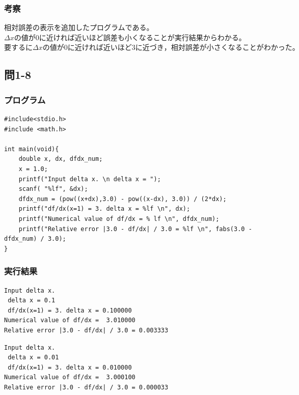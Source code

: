 \documentclass{jarticle}
\begin{document}
\subsubsection{考察\\}
相対誤差の表示を追加したプログラムである。\\
$\Delta {x}の値が0に近ければ近いほど誤差も小くなることが実行結果からわかる。$\\
$要するに\Delta {x}の値が0に近ければ近いほど3に近づき，相対誤差が小さくなることがわかった。$\\

\subsection{問1-8\\}
\subsubsection{プログラム\\}
\begin{breakbox}
\begin{verbatim}
#include<stdio.h>
#include <math.h>

int main(void){
	double x, dx, dfdx_num;
	x = 1.0;
	printf("Input delta x. \n delta x = ");
	scanf( "%lf", &dx);
  	dfdx_num = (pow((x+dx),3.0) - pow((x-dx), 3.0)) / (2*dx);	
	printf("df/dx(x=1) = 3. delta x = %lf \n", dx);
	printf("Numerical value of df/dx = % lf \n", dfdx_num);
  	printf("Relative error |3.0 - df/dx| / 3.0 = %lf \n", fabs(3.0 - dfdx_num) / 3.0);
}
\end{verbatim}
\end{breakbox}
\subsubsection{実行結果\\}
\begin{breakbox}
\begin{verbatim}
Input delta x. 
 delta x = 0.1
 df/dx(x=1) = 3. delta x = 0.100000 
Numerical value of df/dx =  3.010000 
Relative error |3.0 - df/dx| / 3.0 = 0.003333 
\end{verbatim}
\end{breakbox}

\begin{breakbox}
\begin{verbatim}
Input delta x. 
 delta x = 0.01
 df/dx(x=1) = 3. delta x = 0.010000 
Numerical value of df/dx =  3.000100 
Relative error |3.0 - df/dx| / 3.0 = 0.000033 
\end{verbatim}
\end{breakbox}
\end{document}
